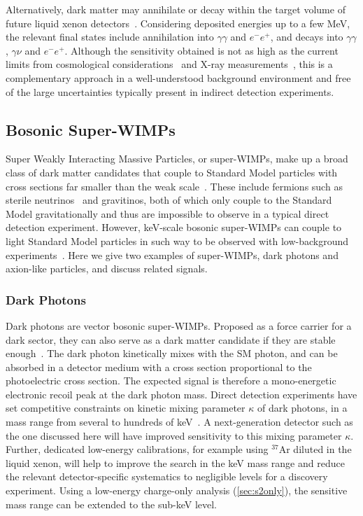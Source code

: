 Alternatively, dark matter may annihilate or decay within the target volume of future liquid xenon detectors~\cite{Undagoitia:2021tza}. Considering deposited energies up to a few MeV, the relevant final states include annihilation into $\gamma\gamma$ and $e^-e^+$, and decays into $\gamma\gamma$, $\gamma\nu$ and $e^-e^+$. Although the sensitivity obtained is not as high as the current limits from cosmological considerations~\cite{Slatyer:2015jla} and X-ray measurements~\cite{Ng:2019gch}, this is a complementary approach in a well-understood background environment and free of the large uncertainties typically present in indirect detection experiments.

\subsection{Bosonic Super-WIMPs}\label{sec:bosonicwimp}

Super Weakly Interacting Massive Particles, or super-WIMPs, make up a broad class of dark matter candidates that couple to Standard Model particles with cross sections far smaller than the weak scale~\cite{Feng:2003xh}. These include fermions such as sterile neutrinos~\cite{Dodelson:1993je} and gravitinos, both of which only couple to the Standard Model gravitationally and thus are impossible to observe in a typical direct detection experiment. However, keV-scale bosonic super-WIMPs can couple to light Standard Model particles in such way to be observed with low-background experiments~\cite{Pospelov:2008jk}. Here we give two examples of super-WIMPs, dark photons and axion-like particles, and discuss related signals.

\subsubsection{Dark Photons}\label{sec:dark_photon}

Dark photons are vector bosonic super-WIMPs. Proposed as a force carrier for a dark sector, they can also serve as a dark matter candidate if they are stable enough~\cite{Pospelov:2008jk}. The dark photon kinetically mixes with the SM photon, and can be absorbed in a detector medium with a cross section proportional to the photoelectric cross section. The expected signal is therefore a mono-energetic electronic recoil peak at the dark photon mass. Direct detection experiments have set competitive constraints on kinetic mixing parameter $\kappa$ of dark photons, in a mass range from several to hundreds of keV~\cite{An:2014twa}. A next-generation detector such as the one discussed here will have improved sensitivity to this mixing parameter $\kappa$. Further, dedicated low-energy calibrations, for example using $^{37}$Ar diluted in the liquid xenon, will help to improve the search in the keV mass range and reduce the relevant detector-specific systematics to negligible levels for a discovery experiment. Using a low-energy charge-only analysis (\autoref{sec:s2only}), the sensitive mass range can be extended to the sub-keV level.

